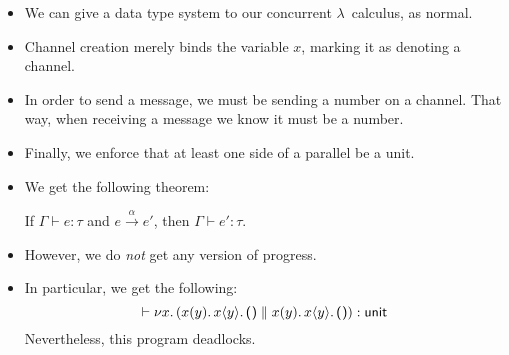 \documentclass{lecturenotes}
\newcommand{\tabs}[3]{\ensuremath{\lambda #1 \colon #2.\,#3}}
\newcommand{\app}[2]{\ensuremath{#1\;#2}}
\newcommand{\utype}{\textsf{unit}\xspace}
\newcommand{\unit}{\ensuremath{\textsf{(}\mkern0.5mu\textsf{)}}}
\newcommand{\newchan}[2]{\ensuremath{\nu #1.\,#2}}
\newcommand{\send}[3]{\ensuremath{#1\langle#2\rangle.\,#3}}
\newcommand{\recv}[3]{\ensuremath{#1(#2).\,#3}}
\newcommand{\chtype}{\textsf{chan}\xspace}
\begin{document}

\begin{itemize}
\item We can give a data type system to our concurrent $\lambda$~calculus, as normal.
\item Channel creation merely binds the variable $x$, marking it as denoting a channel.
\item In order to send a message, we must be sending a number on a channel.
 That way, when receiving a message we know it must be a number.
\item Finally, we enforce that at least one side of a parallel be a unit.
\item We get the following theorem:
  \begin{thm}[Preservation]
    If $\Gamma \vdash e : \tau$ and $e \xrightarrow{\alpha} e'$, then $\Gamma \vdash e' : \tau$.
  \end{thm}
\item However, we do \emph{not} get any version of progress.
\item In particular, we get the following:
  $$\vdash \newchan{x}{(\recv{x}{y}{\send{x}{y}{\unit}} \parallel \recv{x}{y}{\send{x}{y}{\unit}})} : \utype$$
  Nevertheless, this program deadlocks.
\end{itemize}
\end{document}
